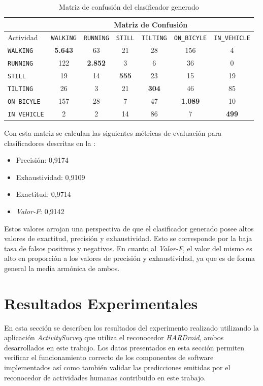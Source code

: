 \begin{table}[h]
\begin{centering}
\begin{tabular}{|l|c|c|c|c|c|c|}
\cline{2-7} 
\multicolumn{1}{l|}{} & \multicolumn{6}{c|}{Matriz de Confusión}\tabularnewline
\hline 
Actividad & \texttt{\footnotesize{}WALKING} & \texttt{\footnotesize{}RUNNING} & \texttt{\footnotesize{}STILL} & \texttt{\footnotesize{}TILTING} & \texttt{\footnotesize{}ON\_BICYLE} & \texttt{\footnotesize{}IN\_VEHICLE}\tabularnewline
\hline 
\hline 
\texttt{\footnotesize{}WALKING} & \textbf{5.643} & 63 & 21 & 28 & 156 & 4\tabularnewline
\hline 
\texttt{\footnotesize{}RUNNING} & 122 & \textbf{2.852} & 3 & 6 & 36 & 0\tabularnewline
\hline 
\texttt{\footnotesize{}STILL} & 19 & 14 & \textbf{555} & 23 & 15 & 19\tabularnewline
\hline 
\texttt{\footnotesize{}TILTING} & 26 & 3 & 21 & \textbf{304} & 46 & 85\tabularnewline
\hline 
\texttt{\footnotesize{}ON BICYLE} & 157 & 28 & 7 & 47 & \textbf{1.089} & 10\tabularnewline
\hline 
\texttt{\footnotesize{}IN VEHICLE} & 2 & 2 & 14 & 86 & 7 & \textbf{499}\tabularnewline
\hline 
\end{tabular}
\par\end{centering}
\caption{\label{tab6:matriz-confusion}Matriz de confusión del clasificador
generado}
\end{table}

Con esta matriz se calculan las siguientes métricas de evaluación
para clasificadores descritas en la :
\begin{itemize}
\item Precisión: 0,9174
\item Exhaustividad: 0,9109
\item Exactitud: 0,9714
\item \emph{Valor-F}: 0,9142
\end{itemize}
Estos valores arrojan una perspectiva de que el clasificador generado
posee altos valores de exactitud, precisión y exhaustividad. Esto
se corresponde por la baja tasa de falsos positivos y negativos. En
cuanto al \emph{Valor-F}, el valor del mismo es alto en proporción
a los valores de precisión y exhaustividad, ya que es de forma general
la media armónica de ambos.

\section{Resultados Experimentales}

\label{sec6:resultados}En esta sección se describen los resultados
del experimento realizado utilizando la aplicación \emph{ActivitySurvey}
que utiliza el reconocedor \emph{HARDroid}, ambos desarrollados en
este trabajo. Los datos presentados en esta sección permiten verificar
el funcionamiento correcto de los componentes de software implementados
así como también validar las predicciones emitidas por el reconocedor
de actividades humanas contribuido en este trabajo.

